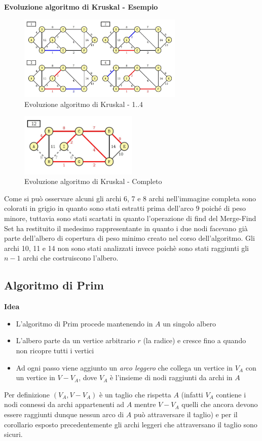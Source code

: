 \documentclass[../cheatSheetAlgoritmi.tex]{subfiles}
\begin{document}
\begin{flushleft}
\textbf{Evoluzione algoritmo di Kruskal - Esempio}
\end{flushleft}
\begin{figure}[h]
	\centering
	\includegraphics[width=0.7\textwidth]{../img/Greedy_7.jpg}
	\caption{Evoluzione algoritmo di Kruskal - 1..4}
\end{figure}
\begin{figure}[h]
	\centering
	\includegraphics[width=0.5\textwidth]{../img/Greedy_8.jpg}
	\caption{Evoluzione algoritmo di Kruskal - Completo}
\end{figure}
Come si può osservare alcuni gli archi 6, 7 e 8 archi nell'immagine completa sono colorati in grigio in quanto sono stati estratti prima dell'arco 9 poiché di peso minore, tuttavia sono stati scartati in quanto l'operazione di find del Merge-Find Set ha restituito il medesimo rappresentante in quanto i due nodi facevano già parte dell'albero di copertura di peso minimo creato nel corso dell'algoritmo. Gli archi 10, 11 e 14 non sono stati analizzati invece poichè sono stati raggiunti gli $n-1$ archi che costruiscono l'albero.
 

\subsection{Algoritmo di Prim}
\textbf{Idea}
\begin{itemize}
	\item L'algoritmo di Prim procede mantenendo in $A$ un singolo albero
	\item L'albero parte da un vertice arbitrario $r$ (la radice) e cresce fino a quando non ricopre tutti i vertici
	\item Ad ogni passo viene aggiunto un \emph{arco leggero} che collega un vertice in $V_{A}$ con un vertice in $V - V_{A}$, dove $V_{A}$ è l'insieme di nodi raggiunti da archi in $A$
\end{itemize}
Per definizione $(V_{A}, V - V_{A})$ è un taglio che rispetta $A$ (infatti $V_{A}$ contiene i nodi connessi da archi appartenenti ad $A$ mentre $V-V_{A}$ quelli che ancora devono essere raggiunti dunque nessun arco di $A$ può attraversare il taglio) e per il corollario esposto precedentemente gli archi leggeri che attraversano il taglio sono sicuri.
\end{document}
